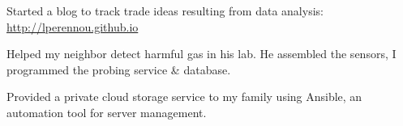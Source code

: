 
\vspace{-.5cm}
\begin{cventries}
  \cventry
  {} %
  {} %
  {} %
  {} %
    {
      \begin{cvitems} %
      \item {Started a blog to track trade ideas resulting from data analysis: \url{http://lperennou.github.io}}
      \item{Helped my neighbor detect harmful gas in his lab. He assembled the sensors, I programmed the probing service \& database.}
      \item{Provided a private cloud storage service to my family using Ansible, an automation tool for server management.}
      \end{cvitems}
    }
\end{cventries}
